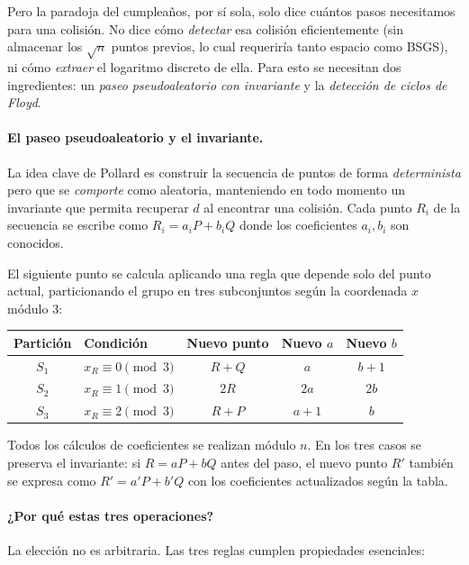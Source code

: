 Pero la paradoja del cumpleaños, por sí sola, solo dice cuántos pasos necesitamos para una colisión. No dice cómo \emph{detectar} esa colisión eficientemente (sin almacenar los $\sqrt{n}$ puntos previos, lo cual requeriría tanto espacio como BSGS), ni cómo \emph{extraer} el logaritmo discreto de ella. Para esto se necesitan dos ingredientes: un \emph{paseo pseudoaleatorio con invariante} y la \emph{detección de ciclos de Floyd}.


\paragraph{El paseo pseudoaleatorio y el invariante.}
La idea clave de Pollard es construir la secuencia de puntos de forma \emph{determinista} pero que se \emph{comporte} como aleatoria, manteniendo en todo momento un invariante que permita recuperar $d$ al encontrar una colisión. Cada punto $R_i$ de la secuencia se escribe como $R_i = a_i P + b_i Q$ donde los coeficientes $a_i, b_i$ son conocidos.

El siguiente punto se calcula aplicando una regla que depende solo del punto actual, particionando el grupo en tres subconjuntos según la coordenada $x$ módulo 3:

\begin{center}
\begin{tabular}{clccc}
\hline
\textbf{Partición} & \textbf{Condición} & \textbf{Nuevo punto} & \textbf{Nuevo $a$} & \textbf{Nuevo $b$} \\
\hline
$S_1$ & $x_R \equiv 0 \pmod{3}$ & $R + Q$ & $a$ & $b + 1$ \\
$S_2$ & $x_R \equiv 1 \pmod{3}$ & $2R$ & $2a$ & $2b$ \\
$S_3$ & $x_R \equiv 2 \pmod{3}$ & $R + P$ & $a + 1$ & $b$ \\
\hline
\end{tabular}
\end{center}

Todos los cálculos de coeficientes se realizan módulo $n$. En los tres casos se preserva el invariante: si $R = aP + bQ$ antes del paso, el nuevo punto $R'$ también se expresa como $R' = a'P + b'Q$ con los coeficientes actualizados según la tabla.

\paragraph{¿Por qué estas tres operaciones?}
La elección no es arbitraria. Las tres reglas cumplen propiedades esenciales:

